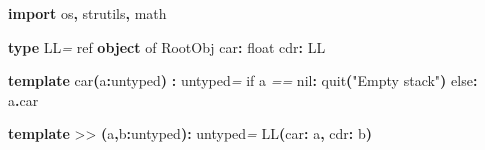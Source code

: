 \documentclass[
  12pt,
]{book}
\newenvironment{Shaded}{}{}
\newcommand{\CommentTok}[1]{\textcolor[rgb]{0.38,0.63,0.69}{\textit{#1}}}
\newcommand{\DataTypeTok}[1]{\textcolor[rgb]{0.56,0.13,0.00}{#1}}
\newcommand{\FloatTok}[1]{\textcolor[rgb]{0.25,0.63,0.44}{#1}}
\newcommand{\KeywordTok}[1]{\textcolor[rgb]{0.00,0.44,0.13}{\textbf{#1}}}
\newcommand{\NormalTok}[1]{#1}
\newcommand{\StringTok}[1]{\textcolor[rgb]{0.25,0.44,0.63}{#1}}
\begin{document}
\begin{Shaded}
\begin{Highlighting}[]
\KeywordTok{import}\NormalTok{ os}\KeywordTok{,}\NormalTok{ strutils}\KeywordTok{,}\NormalTok{ math}

\KeywordTok{type }\DataTypeTok{LL}\CommentTok{=} \DataTypeTok{ref} \KeywordTok{object }\DataTypeTok{of}\CommentTok{ }\DataTypeTok{RootObj}
\NormalTok{    car}\KeywordTok{:} \DataTypeTok{float}
\NormalTok{    cdr}\KeywordTok{:} \DataTypeTok{LL}

\KeywordTok{template }\StringTok{car}\KeywordTok{(}\NormalTok{a}\KeywordTok{:}\DataTypeTok{untyped}\KeywordTok{)} \KeywordTok{:} \DataTypeTok{untyped}\CommentTok{=}
  \DataTypeTok{if}\NormalTok{ a }\CommentTok{==} \FloatTok{nil}\KeywordTok{:} \DataTypeTok{quit}\KeywordTok{(}\StringTok{"Empty stack"}\KeywordTok{)}
  \DataTypeTok{else}\KeywordTok{:}\NormalTok{ a}\KeywordTok{.}\DataTypeTok{car}

\KeywordTok{template }\StringTok{\textasciigrave{}\textgreater{}\textgreater{}\textasciigrave{}}\CommentTok{ }\KeywordTok{(}\NormalTok{a}\KeywordTok{,}\NormalTok{b}\KeywordTok{:}\DataTypeTok{untyped}\KeywordTok{):} \DataTypeTok{untyped}\CommentTok{=} \DataTypeTok{LL}\KeywordTok{(}\NormalTok{car}\KeywordTok{:}\NormalTok{ a}\KeywordTok{,}\NormalTok{ cdr}\KeywordTok{:}\NormalTok{ b}\KeywordTok{)}


\end{Highlighting}
\end{Shaded}
\end{document}
